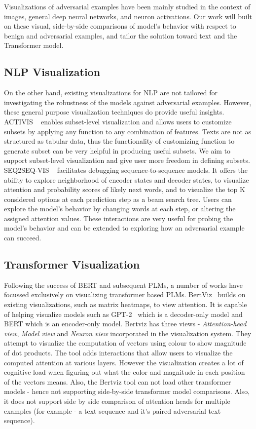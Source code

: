 \documentclass[journal]{vgtc}                %
\begin{document}
Visualizations of adversarial examples have been mainly studied in the context of images, general deep neural networks, and neuron activations. Our work will built on these visual, side-by-side comparisons of model's behavior with respect to benign and adversarial examples, and tailor the solution toward text and the Transformer model.


\subsection{NLP Visualization}
On the other hand, existing visualizations for NLP are not tailored for investigating the robustness of the models against adversarial examples. However, these general purpose visualization techniques do provide useful insights.  ACTIVIS ~\cite{ACTIVIS} enables subset-level visualization and allows users to customize subsets by applying any function to any combination of features. Texts are not as structured as tabular data, thus the functionality of customizing function to generate subset can be very helpful in producing useful subsets. We aim to support subset-level visualization and give user more freedom in defining subsets.
SEQ2SEQ-VIS ~\cite{SEQ2SEQVIS} facilitates debugging sequence-to-sequence models. It offers the ability to explore neighborhood of encoder states and decoder states, to visualize attention and probability scores of likely next words, and to visualize the top K considered options at each prediction step as a beam search tree. Users can explore the model's behavior by changing words at each step, or altering the assigned attention values. These interactions are very useful for probing the model's behavior and can be extended to exploring how an adversarial example can succeed.

\subsection{Transformer Visualization}
Following the success of BERT and subsequent PLMs, a number of works have focussed exclusively on visualizing transformer based PLMs. BertViz~\cite{vig-2019-multiscale} builds on existing visualizations, such as matrix heatmaps, to view attention. It is capable of helping visualize models such as GPT-2~\cite{radford2019language} which is a decoder-only model and BERT which is an encoder-only model. Bertviz has three views - \textit{Attention-head view}, \textit{Model view} and \textit{Neuron view} incorporated in the visualization system. They attempt to visualize the computation of vectors using colour to show magnitude of dot products. The tool adds interactions that allow users to visualize the computed attention at various layers. However the visualization creates a  lot of cognitive load when figuring out what the color and magnitude in each position of the vectors means. Also, the Bertviz tool can not load other transformer models - hence not supporting side-by-side transformer model comparisons. Also, it does not support side by side comparison of attention heads for multiple examples (for example - a text sequence and it's paired adversarial text sequence). 
\end{document}
